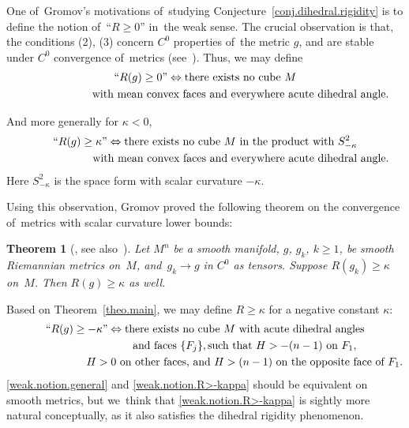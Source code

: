 \documentclass[pdftex]{sigma}
\numberwithin{equation}{section}
\newtheorem{theo}[prop]{Theorem}
\theoremstyle{definition}
\begin{document}
One of~Gromov's motivations of~studying Conjecture~\ref{conj.dihedral.rigidity} is to define the notion of~``$R\ge 0$'' in~the weak sense. The crucial observation is that, the conditions (2), (3) concern $C^0$ properties of~the metric $g$, and are stable under $C^0$ convergence of~metrics (see~\cite{Gromov2014Dirac}). Thus, we may define{\samepage
\begin{gather*}
\text{``}R(g)\ge 0\text{''} \Leftrightarrow \text{there exists no cube }M \nonumber
\\ \hphantom{\text{``}R(g)\ge 0\text{''} \Leftrightarrow{}}
\text{with mean convex faces and everywhere acute dihedral angle.}%
\end{gather*}}

And more generally for $\kappa<0$,
\begin{gather}
\text{``}R(g)\ge \kappa \text{''} \Leftrightarrow \text{there exists no cube }M \text{ in the product with }S^2_{-\kappa}\nonumber
\\ \hphantom{\text{``}R(g)\ge \kappa \text{''} \Leftrightarrow{}}
\text{with mean convex faces and everywhere acute dihedral angle.}\label{weak.notion.general}
\end{gather}
Here $S^2_{-\kappa}$ is the space form with scalar curvature $-\kappa$.

Using this observation, Gromov proved the following theorem on the convergence of~metrics with scalar curvature lower bounds:

\begin{theo}[\cite{Gromov2014Dirac}, see also~\cite{bamler2016ricci}]
Let $M^n$ be a smooth manifold, $g$, $g_k$, $k\ge 1$, be smooth Riemannian metrics on~$M$, and~$g_k\rightarrow g$ in $C^0$ as tensors. Suppose $R(g_k)\ge \kappa$ on~$M$. Then $R(g)\ge \kappa$ as well.
\end{theo}

Based on Theorem~\ref{theo.main}, we may define $R\ge \kappa$ for a negative constant $\kappa$:
\begin{gather}
\text{``}R(g)\ge -\kappa\text{''} \Leftrightarrow \text{there exists no cube }M \text{ with acute dihedral angles}\nonumber
\\ \hphantom{\text{``}R(g)\ge -\kappa\text{''} \Leftrightarrow{}}
\text{and faces }\{F_j\}, \text{such that } H>-(n-1) \text{ on }F_1,\nonumber
\\ \hphantom{\text{``}R(g)\ge -\kappa\text{''} \Leftrightarrow{}}
H>0 \text{ on other faces, and }H>(n-1) \text{ on the opposite face of~}F_1.\label{weak.notion.R>-kappa}
\end{gather}
\eqref{weak.notion.general} and \eqref{weak.notion.R>-kappa} should be equivalent on smooth metrics, but we~think that \eqref{weak.notion.R>-kappa} is sightly more natural conceptually, as it also satisfies the dihedral rigidity phenomenon.
\end{document}
